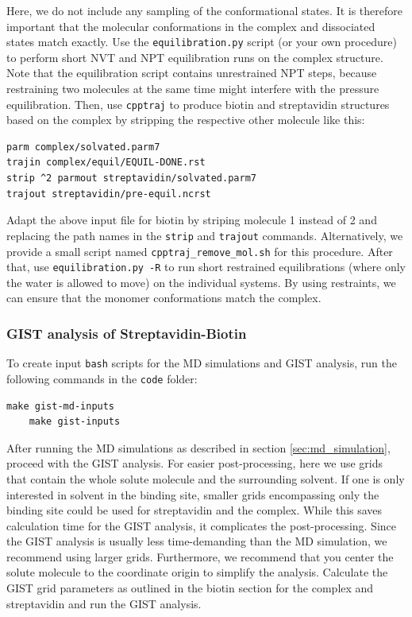 \documentclass[9pt,tutorial]{livecoms}
\newcommand{\software}{\texttt}
\newcommand{\code}{\texttt}
\newcommand\inlinecode{\texttt}
\begin{document}
Here, we do not include any sampling of the conformational states.
It is therefore important that the molecular conformations in the complex and dissociated states match exactly.
Use the \software{equilibration.py} script (or your own procedure) to perform short NVT and NPT equilibration runs on the complex structure.
Note that the equilibration script contains unrestrained NPT steps, because restraining two molecules at the same time might interfere with the pressure equilibration.
Then, use \software{cpptraj} to produce biotin and streptavidin structures based on the complex by stripping the respective other molecule like this:
\begin{lstlisting}[style=cpptraj]
parm complex/solvated.parm7
trajin complex/equil/EQUIL-DONE.rst
strip ^2 parmout streptavidin/solvated.parm7
trajout streptavidin/pre-equil.ncrst
\end{lstlisting}
Adapt the above input file for biotin by striping molecule 1 instead of 2 and replacing the path names in the \inlinecode{strip} and  \inlinecode{trajout} commands.
Alternatively, we provide a small script named \software{cpptraj\_remove\_mol.sh} for this procedure.
After that, use \software{equilibration.py -R} to run short restrained 
equilibrations (where only the water is allowed to move) on the individual 
systems.
By using restraints, we can ensure that the monomer conformations match the complex.

\subsubsection{GIST analysis of Streptavidin-Biotin}
To create input \code{bash} scripts for the MD simulations and GIST analysis, run the following commands in the \code{code} folder:
\begin{lstlisting}[style=bash]
	make gist-md-inputs
	make gist-inputs
\end{lstlisting}
After running the MD simulations as described in section \ref{sec:md_simulation}, proceed with the GIST analysis.
For easier post-processing, here we use grids that contain the whole solute molecule and the surrounding solvent.
If one is only interested in solvent in the binding site, smaller grids encompassing only the binding site could be used for streptavidin and the complex.
While this saves calculation time for the GIST analysis, it complicates the post-processing.
Since the GIST analysis is usually less time-demanding than the MD simulation, we recommend using larger grids.
Furthermore, we recommend that you center the solute molecule to the coordinate origin to simplify the analysis.
Calculate the GIST grid parameters as outlined in the biotin section for the complex and streptavidin and run the GIST analysis.
\end{document}
